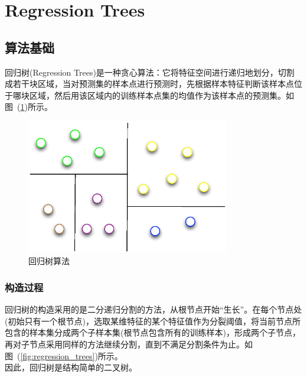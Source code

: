\documentclass[a4paper,11pt,         %
               ]{article}
\begin{document}
\section{Regression Trees}

\subsection{算法基础}

回归树(Regression Trees)是一种贪心算法：它将特征空间进行递归地划分，切割成若干块区域，当对预测集的样本点进行预测时，先根据样本特征判断该样本点位于哪块区域，然后用该区域内的训练样本点集的均值作为该样本点的预测集。如图~(\ref{fig:regression_trees_cut})所示。

\begin{figure}[htbp]
\centering\includegraphics[width=3.5in]{img/regression_trees_cut.eps}
\caption{回归树算法}\label{fig:regression_trees_cut}
\end{figure}

\subsubsection{构造过程}

回归树的构造采用的是二分递归分割的方法，从根节点开始“生长”。在每个节点处(初始只有一个根节点)，选取某维特征的某个特征值作为分裂阈值，将当前节点所包含的样本集分成两个子样本集(根节点包含所有的训练样本)，形成两个子节点，再对子节点采用同样的方法继续分割，直到不满足分割条件为止。如图~(\ref{fig:regression_trees})所示。 \\

因此，回归树是结构简单的二叉树。 
\end{document}
